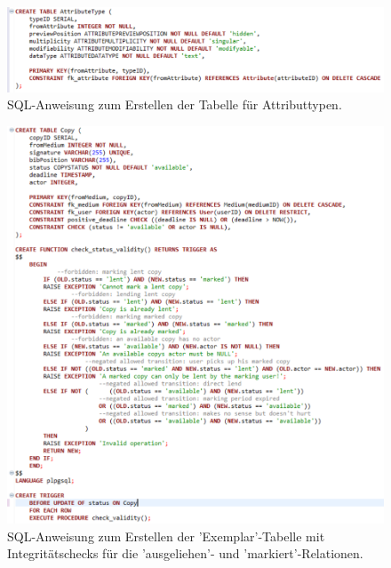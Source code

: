 \documentclass{article}
\begin{document}
\begin{figure}
\hypertarget{AttributeType}{}
\flushleft
\includegraphics[width=60em]{SQLATTRIBUTETYPE}
\caption{SQL-Anweisung zum Erstellen der Tabelle für Attributtypen.}
\end{figure}

\begin{figure}
\hypertarget{Copy}{}
\centering
\includegraphics[width=60em]{SQLCOPY}
\caption{SQL-Anweisung zum Erstellen der 'Exemplar'-Tabelle mit Integritätschecks für die 'ausgeliehen'- und  'markiert'-Relationen.}
\end{figure}
\restoregeometry
\end{document}
